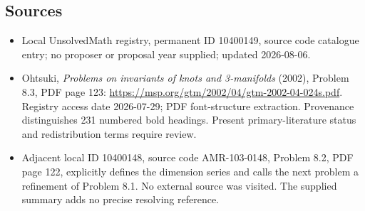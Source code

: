 \documentclass[11pt]{article}
\begin{document}
\subsection{Sources}
\begin{itemize}
\item Local UnsolvedMath registry, permanent ID 10400149, source code catalogue entry; no proposer or proposal year supplied; updated 2026-08-06.
\item Ohtsuki, \emph{Problems on invariants of knots and 3-manifolds} (2002), Problem 8.3, PDF page 123: \url{https://msp.org/gtm/2002/04/gtm-2002-04-024s.pdf}. Registry access date 2026-07-29; PDF font-structure extraction. Provenance distinguishes 231 numbered bold headings. Present primary-literature status and redistribution terms require review.
\item Adjacent local ID 10400148, source code AMR-103-0148, Problem 8.2, PDF page 122, explicitly defines the dimension series and calls the next problem a refinement of Problem 8.1. No external source was visited. The supplied summary adds no precise resolving reference.
\end{itemize}
\end{document}
